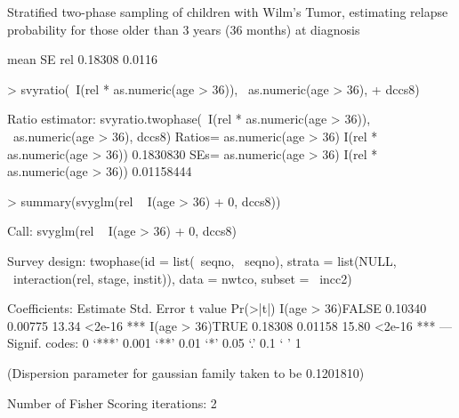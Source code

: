 \documentclass{article}
\begin{document}
Stratified two-phase sampling of children with Wilm's Tumor,
estimating relapse probability for those older than 3 years (36
months) at diagnosis
\begin{Schunk}
\begin{Soutput}
       mean     SE
rel 0.18308 0.0116
\end{Soutput}
\begin{Sinput}
> svyratio(~I(rel * as.numeric(age > 36)), ~as.numeric(age > 36), 
+     dccs8)
\end{Sinput}
\begin{Soutput}
Ratio estimator: svyratio.twophase(~I(rel * as.numeric(age > 36)), ~as.numeric(age > 
    36), dccs8)
Ratios=
                              as.numeric(age > 36)
I(rel * as.numeric(age > 36))            0.1830830
SEs=
                              as.numeric(age > 36)
I(rel * as.numeric(age > 36))           0.01158444
\end{Soutput}
\begin{Sinput}
> summary(svyglm(rel ~ I(age > 36) + 0, dccs8))
\end{Sinput}
\begin{Soutput}
Call:
svyglm(rel ~ I(age > 36) + 0, dccs8)

Survey design:
twophase(id = list(~seqno, ~seqno), strata = list(NULL, ~interaction(rel, 
    stage, instit)), data = nwtco, subset = ~incc2)

Coefficients:
                 Estimate Std. Error t value Pr(>|t|)    
I(age > 36)FALSE  0.10340    0.00775   13.34   <2e-16 ***
I(age > 36)TRUE   0.18308    0.01158   15.80   <2e-16 ***
---
Signif. codes:  0 ‘***’ 0.001 ‘**’ 0.01 ‘*’ 0.05 ‘.’ 0.1 ‘ ’ 1 

(Dispersion parameter for gaussian family taken to be 0.1201810)

Number of Fisher Scoring iterations: 2
\end{Soutput}
\end{Schunk}
\end{document}
